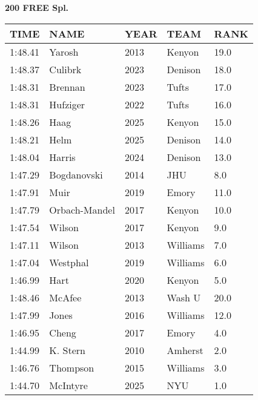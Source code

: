 \begin{table}[H]
\centering
\begin{minipage}[t]{0.6\textwidth}
\centering
\textbf{200 FREE Spl.}\\[0.1cm]
\begin{tabular}{@{}p{1.8cm}p{2.8cm}p{1.2cm}p{1.4cm}p{0.8cm}@{}}
\hline
    \textbf{TIME} & \textbf{NAME} & \textbf{YEAR} & \textbf{TEAM} & \textbf{RANK} \\
\hline
    1:48.41 & Yarosh & 2013 & Kenyon & 19.0 \\
    1:48.37 & Culibrk & 2023 & Denison & 18.0 \\
    1:48.31 & Brennan & 2023 & Tufts & 17.0 \\
    1:48.31 & Hufziger & 2022 & Tufts & 16.0 \\
    1:48.26 & Haag & 2025 & Kenyon & 15.0 \\
    1:48.21 & Helm & 2025 & Denison & 14.0 \\
    1:48.04 & Harris & 2024 & Denison & 13.0 \\
    1:47.29 & Bogdanovski & 2014 & JHU & 8.0 \\
    1:47.91 & Muir & 2019 & Emory & 11.0 \\
    1:47.79 & Orbach-Mandel & 2017 & Kenyon & 10.0 \\
    1:47.54 & Wilson & 2017 & Kenyon & 9.0 \\
    1:47.11 & Wilson & 2013 & Williams & 7.0 \\
    1:47.04 & Westphal & 2019 & Williams & 6.0 \\
    1:46.99 & Hart & 2020 & Kenyon & 5.0 \\
    1:48.46 & McAfee & 2013 & Wash U & 20.0 \\
    1:47.99 & Jones & 2016 & Williams & 12.0 \\
    1:46.95 & Cheng & 2017 & Emory & 4.0 \\
    1:44.99 & K. Stern & 2010 & Amherst & 2.0 \\
    1:46.76 & Thompson & 2015 & Williams & 3.0 \\
    1:44.70 & McIntyre & 2025 & NYU & 1.0 \\
\hline
\end{tabular}
\end{minipage}
\end{table}

